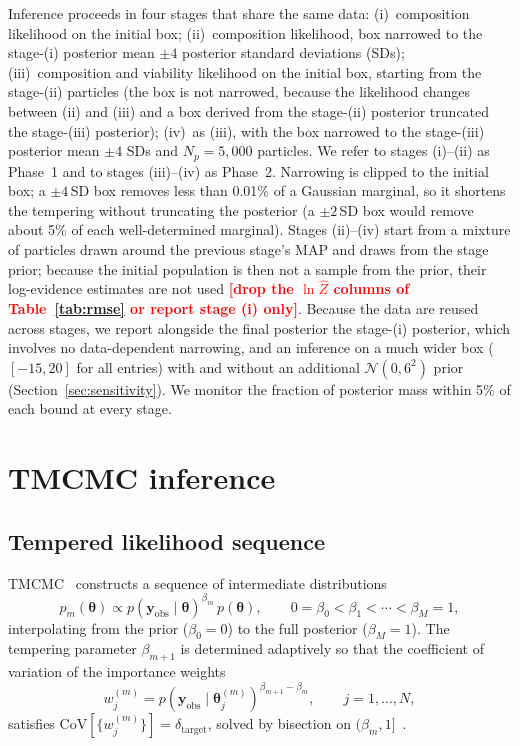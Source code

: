 \documentclass[pdflatex,sn-mathphys-ay,lineno]{sn-jnl}%
\newcommand{\btheta}{\boldsymbol{\theta}}
\newcommand{\yobs}{\mathbf{y}_{\mathrm{obs}}}
\newcommand{\TBD}[1]{\textcolor{red}{\textbf{[#1]}}}
\begin{document}
Inference proceeds in four stages that share the same data:
(i)~composition likelihood on the initial box;
(ii)~composition likelihood, box narrowed to the stage-(i) posterior mean $\pm4$ posterior standard deviations (SDs);
(iii)~composition and viability likelihood on the initial box, starting from the stage-(ii) particles (the box is not narrowed, because the likelihood changes between (ii) and (iii) and a box derived from the stage-(ii) posterior truncated the stage-(iii) posterior);
(iv)~as (iii), with the box narrowed to the stage-(iii) posterior mean $\pm4$ SDs and $N_p=5{,}000$ particles.
We refer to stages (i)--(ii) as Phase~1 and to stages (iii)--(iv) as Phase~2.
Narrowing is clipped to the initial box; a $\pm4$\,SD box removes less than 0.01\% of a Gaussian marginal, so it shortens the tempering without truncating the posterior (a $\pm2$\,SD box would remove about 5\% of each well-determined marginal). Stages (ii)--(iv) start from a mixture of particles drawn around the previous stage's MAP and draws from the stage prior; because the initial population is then not a sample from the prior, their log-evidence estimates are not used \TBD{drop the $\ln\hat{Z}$ columns of Table~\ref{tab:rmse} or report stage (i) only}.
Because the data are reused across stages, we report alongside the final posterior the stage-(i) posterior, which involves no data-dependent narrowing, and an inference on a much wider box ($[-15,20]$ for all entries) with and without an additional $\mathcal{N}(0,6^2)$ prior (Section~\ref{sec:sensitivity}).
We monitor the fraction of posterior mass within 5\% of each bound at every stage.

\section{TMCMC inference}
\label{sec:tmcmc}

\subsection{Tempered likelihood sequence}

TMCMC~\citep{ChingChen2007TMCMC, DelMoral2006SMC, Chopin2002SMC} constructs a sequence of intermediate distributions
\begin{equation}
p_m(\btheta) \propto p(\yobs\mid\btheta)^{\beta_m}\,p(\btheta),
\qquad
0=\beta_0<\beta_1<\cdots<\beta_M=1,
\label{eq:tempered}
\end{equation}
interpolating from the prior ($\beta_0=0$) to the full posterior ($\beta_M=1$).
The tempering parameter $\beta_{m+1}$ is determined adaptively so that the coefficient of variation of the importance weights
\begin{equation}
w_j^{(m)} = p(\yobs\mid\btheta_j^{(m)})^{\beta_{m+1}-\beta_m},
\qquad j=1,\dots,N,
\label{eq:weights}
\end{equation}
satisfies $\mathrm{CoV}[\{w_j^{(m)}\}]=\delta_{\mathrm{target}}$, solved by bisection on $(\beta_m,1]$~\citep{Betz2016TMCMC}.
\end{document}

